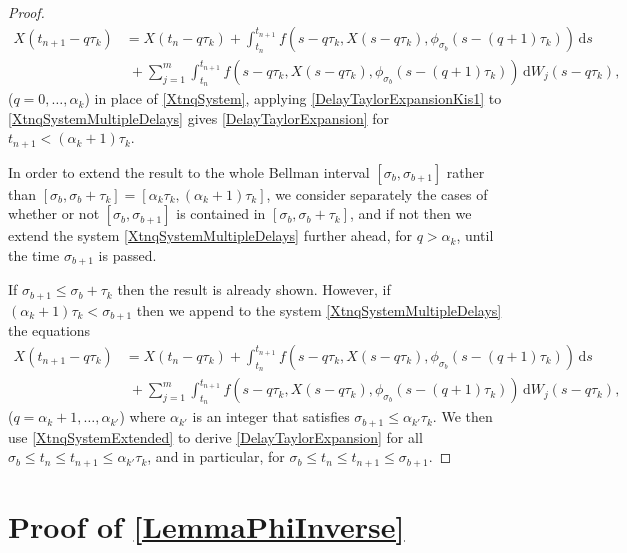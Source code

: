 \documentclass[onefignum]{siamart250211}
\begin{document}
\begin{proof}
\begin{align}
X(t_{n+1}-q\tau_k)&=X(t_n-q\tau_k)+\int_{t_n}^{t_{n+1}}f(s-q\tau_k,X(s-q\tau_k),\phi_{\sigma_b}(s-(q+1)\tau_k))\,\mathrm{d}s\nonumber\\
&\;+\sum_{j=1}^m\int_{t_n}^{t_{n+1}}f(s-q\tau_k,X(s-q\tau_k),\phi_{\sigma_b}(s-(q+1)\tau_k))\,\mathrm{d}W_j(s-q\tau_k),\label{XtnqSystemMultipleDelays}
\end{align}
($q=0,\ldots,\alpha_k$) in place of \cref{XtnqSystem}, applying \cref{DelayTaylorExpansionKis1} to \cref{XtnqSystemMultipleDelays} gives \cref{DelayTaylorExpansion} for $t_{n+1}<(\alpha_k+1)\tau_k$.

In order to extend the result to the whole Bellman interval $[\sigma_b,\sigma_{b+1}]$ rather than $[\sigma_b,\sigma_b+\tau_k]=[\alpha_k\tau_k,(\alpha_k+1)\tau_k]$, we consider separately the cases of whether or not $[\sigma_b,\sigma_{b+1}]$ is contained in $[\sigma_b,\sigma_b+\tau_k]$, and if not then we extend the system \cref{XtnqSystemMultipleDelays} further ahead, for $q>\alpha_k$, until the time $\sigma_{b+1}$ is passed.

If $\sigma_{b+1}\leqslant\sigma_b+\tau_k$ then the result is already shown. However, if $(\alpha_k+1)\tau_k<\sigma_{b+1}$ then we append to the system \cref{XtnqSystemMultipleDelays} the equations
\begin{align}
X(t_{n+1}-q\tau_k)&=X(t_n-q\tau_k)+\int_{t_n}^{t_{n+1}}f(s-q\tau_k,X(s-q\tau_k),\phi_{\sigma_b}(s-(q+1)\tau_k))\,\mathrm{d}s\nonumber\\
&\;+\sum_{j=1}^m\int_{t_n}^{t_{n+1}}f(s-q\tau_k,X(s-q\tau_k),\phi_{\sigma_b}(s-(q+1)\tau_k))\,\mathrm{d}W_j(s-q\tau_k),\label{XtnqSystemExtended}
\end{align}
($q=\alpha_k+1,\ldots,\alpha_{k'}$) where $\alpha_{k'}$ is an integer that satisfies $\sigma_{b+1}\leqslant\alpha_{k'}\tau_k$. We then use \cref{XtnqSystemExtended} to derive \cref{DelayTaylorExpansion} for all $\sigma_b\leqslant t_n\leqslant t_{n+1}\leqslant\alpha_{k'}\tau_k$, and in particular, for $\sigma_b\leqslant t_n\leqslant t_{n+1}\leqslant \sigma_{b+1}$.
\end{proof}


\section[Proof of exp(-Omega) SDE]{Proof of \cref{LemmaPhiInverse}}\label{ProofofLemmaPhiInverseLemma}
\end{document}

